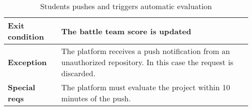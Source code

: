 \begin{enumerate}[label=\textbf{UC\arabic*}:,ref=UC\arabic*,leftmargin=1.3cm]
{\begin{table}[H]
\begin{tabular}{|l|p{11.9cm}|}
                        \textbf{Exit condition}  & The battle team score is updated                                                                                  \\\hline
                        \textbf{Exception}       & The platform receives a push notification from an unauthorized repository. In this case the request is discarded. \\\hline
                        \textbf{Special reqs}    & The platform must evaluate the project within 10 minutes of the push.                                             \\\hline
                  \end{tabular}
                  \caption{Students pushes and triggers automatic evaluation}
                  \label{table:Students pushes and triggers automatic evaluation}
            \end{table}
            \begin{adjustbox}{
                        max size={\textwidth}{},
                        caption={Students pushes and triggers automatic evaluation},
                        label={fig:Students pushes and triggers automatic evaluation},
                        figure=H}
                  \centering
            \end{adjustbox}
            \pagebreak
      }
\end{enumerate}

